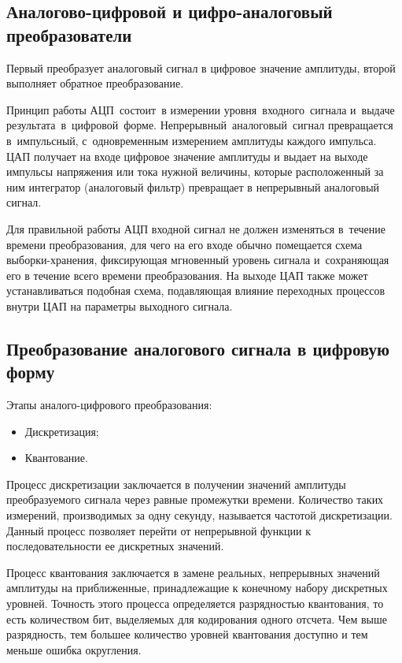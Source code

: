 \documentclass{ou}
\begin{document}
\subsection{Аналогово-цифровой и цифро-аналоговый преобразователи}
Первый преобразует аналоговый сигнал в цифровое значение амплитуды, второй выполняет обратное преобразование. 

Принцип работы АЦП~состоит~в измерении уровня~входного~сигнала и~выдаче результата~в~цифровой~форме. Непрерывный~аналоговый~сигнал превращается в~импульсный, с~одновременным измерением амплитуды каждого импульса. ЦАП получает на входе цифровое значение амплитуды и выдает на выходе импульсы напряжения или тока нужной величины, которые расположенный за ним интегратор (аналоговый фильтр) превращает в непрерывный аналоговый сигнал.

Для правильной работы АЦП входной сигнал не должен изменяться в~течение времени преобразования, для чего на его входе обычно помещается схема выборки-хранения, фиксирующая мгновенный уровень сигнала и~сохраняющая его в течение всего времени преобразования. На выходе ЦАП также может устанавливаться подобная схема, подавляющая влияние переходных процессов внутри ЦАП на параметры выходного сигнала\cite{ixbt}.
\subsection{Преобразование аналогового сигнала в цифровую форму}
Этапы аналого-цифрового преобразования:
\begin{itemize}[label=-, leftmargin=0em, itemindent=3.35em, nosep]
\item Дискретизация;
\item Квантование.
\end{itemize}

Процесс дискретизации заключается в получении значений амплитуды преобразуемого сигнала через равные промежутки времени. Количество таких измерений, производимых за одну секунду, называется частотой дискретизации. Данный процесс позволяет перейти от непрерывной функции к последовательности ее дискретных значений.

Процесс квантования заключается в замене реальных, непрерывных значений амплитуды на приближенные, принадлежащие к конечному набору дискретных уровней. Точность этого процесса определяется разрядностью квантования, то есть количеством бит, выделяемых для кодирования одного отсчета. Чем выше разрядность, тем большее количество уровней квантования доступно и тем меньше ошибка округления\cite{spravochnik}.
\end{document}
